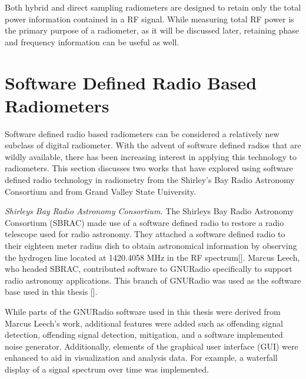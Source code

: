 
Both hybrid and direct sampling radiometers are designed to retain only the total power information contained in a RF signal.  While measuring total RF power is the primary purpose of a radiometer, as it will be discussed later, retaining phase and frequency information can be useful as well.

\section{Software Defined Radio Based Radiometers}

Software defined radio based radiometers can be considered a relatively new subclass of digital radiometer.  With the advent of software defined radios that are wildly available, there has been increasing interest in applying this technology to radiometers.  This section discusses two works that have explored using software defined radio technology in radiometry from the Shirley's Bay Radio Astronomy Consortium and from Grand Valley State University.

\emph{Shirleys Bay Radio Astronomy Consortium.}  The Shirleys Bay Radio Astronomy Consortium (SBRAC) made use of a software defined radio to restore a radio telescope used for radio astronomy.  They attached a software defined radio to their eighteen meter radius dish to obtain astronomical information by observing the hydrogen line located at 1420.4058 MHz in the RF spectrum[\cite{Leech2007}].  Marcus Leech, who headed SBRAC, contributed software to GNURadio specifically to support radio astronomy applications.  This branch of GNURadio was used as the software base used in this thesis [\cite{Leech}].

While parts of the GNURadio software used in this thesis were derived from Marcus Leech's work, additional features were added such as offending signal detection, offending signal detection, mitigation, and a software implemented noise generator.  Additionally, elements of the graphical user interface (GUI) were enhanced to aid in visualization and analysis data.  For example, a waterfall display of a signal spectrum over time was implemented.

